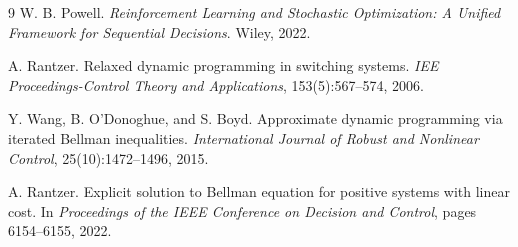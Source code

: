 \documentclass{article}
\begin{document}
\begin{thebibliography}{9}
W. B. Powell.
\newblock \emph{Reinforcement Learning and Stochastic Optimization: A Unified Framework for Sequential Decisions}.
\newblock Wiley, 2022.

A. Rantzer.
\newblock Relaxed dynamic programming in switching systems.
\newblock \emph{IEE Proceedings-Control Theory and Applications}, 153(5):567--574, 2006.


Y. Wang, B. O'Donoghue, and S. Boyd.
\newblock Approximate dynamic programming via iterated Bellman inequalities.
\newblock \emph{International Journal of Robust and Nonlinear Control}, 25(10):1472--1496, 2015.

A. Rantzer.
\newblock Explicit solution to Bellman equation for positive systems with linear cost.
\newblock In \emph{Proceedings of the IEEE Conference on Decision and Control}, pages 6154--6155, 2022.

\end{thebibliography}
\end{document}
